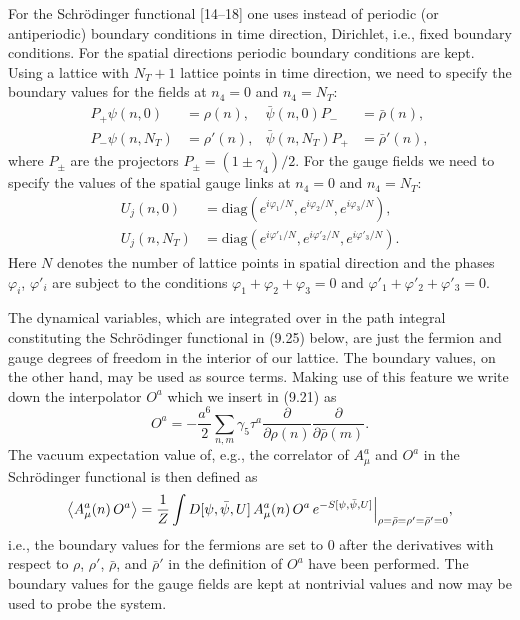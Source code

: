For the Schr\"odinger functional [14--18] one uses instead of periodic (or
antiperiodic) boundary conditions in time direction, Dirichlet, i.e., fixed
boundary conditions. For the spatial directions periodic boundary conditions
are kept. Using a lattice with $N_T + 1$ lattice points in time direction, we
need to specify the boundary values for the fields at $n_4 = 0$ and $n_4 =
N_T$:
\begin{align}
  P_+\psi(n,0) &= \rho(n) , & \bar\psi(n,0)P_- &= \bar\rho(n) , \nonumber\\
  P_-\psi(n,N_T) &= \rho'(n) , & \bar\psi(n,N_T)P_+ &= \bar\rho'(n) ,
\end{align}
where $P_\pm$ are the projectors $P_\pm = (1 \pm \gamma_4)/2$. For the gauge
fields we need to specify the values of the spatial gauge links at $n_4 = 0$
and $n_4 = N_T$:
\begin{align}
  U_j(n,0) &= \mathrm{diag}\left(e^{i\varphi_1/N}, e^{i\varphi_2/N}, e^{i\varphi_3/N}\right) , \nonumber\\
  U_j(n,N_T) &= \mathrm{diag}\left(e^{i\varphi'_1/N}, e^{i\varphi'_2/N}, e^{i\varphi'_3/N}\right) .
\end{align}
Here $N$ denotes the number of lattice points in spatial direction and the
phases $\varphi_i$, $\varphi'_i$ are subject to the conditions $\varphi_1 +
\varphi_2 + \varphi_3 = 0$ and $\varphi'_1 + \varphi'_2 + \varphi'_3 = 0$.

The dynamical variables, which are integrated over in the path integral
constituting the Schr\"odinger functional in (9.25) below, are just the
fermion and gauge degrees of freedom in the interior of our lattice. The
boundary values, on the other hand, may be used as source terms. Making use of
this feature we write down the interpolator $O^a$ which we insert in (9.21) as
\begin{equation}
  O^a = -\frac{a^6}{2}\sum_{n,m}\gamma_5\tau^a
    \frac{\partial}{\partial\rho(n)}\frac{\partial}{\partial\bar\rho(m)} .
\end{equation}
The vacuum expectation value of, e.g., the correlator of $A^a_\mu$ and $O^a$
in the Schr\"odinger functional is then defined as
\begin{equation}
  \left\langle A^a_\mu(n)\,O^a \right\rangle
  = \frac{1}{Z}\int D[\psi,\bar\psi,U]\,A^a_\mu(n)\,O^a\,e^{-S[\psi,\bar\psi,U]}
    \Big|_{\rho=\bar\rho=\rho'=\bar\rho'=0} ,
\end{equation}
i.e., the boundary values for the fermions are set to 0 after the derivatives
with respect to $\rho$, $\rho'$, $\bar\rho$, and $\bar\rho'$ in the definition
of $O^a$ have been performed. The boundary values for the gauge fields are
kept at nontrivial values and now may be used to probe the system.

